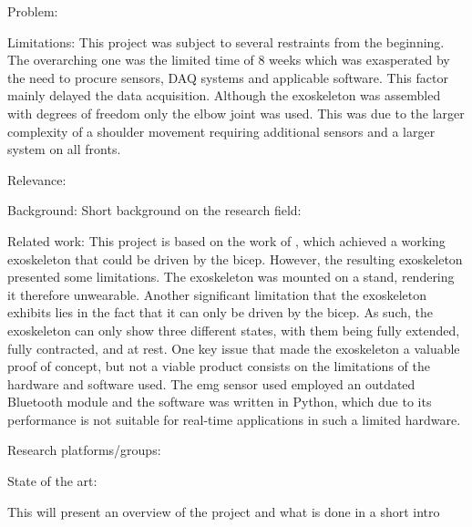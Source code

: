             Problem:
                

            Limitations:
                This project was subject to several restraints from the beginning. The overarching one was the limited time of 8 weeks which was
                exasperated by the need to procure sensors, DAQ systems and applicable software. This factor mainly delayed the data acquisition. 
                Although the exoskeleton was assembled with degrees of freedom only the elbow joint was used. This was due to the larger complexity 
                of a shoulder movement requiring additional sensors and a larger system on all fronts.
            
            Relevance: %


Background: 
    Short background on the research field:

    Related work: %
        This project is based on the work of \cite{AFES}, which achieved a working exoskeleton that could be driven by the bicep. However, the resulting 
        exoskeleton presented some limitations. The exoskeleton was mounted on a stand, rendering it therefore unwearable. Another significant limitation 
        that the exoskeleton exhibits lies in the fact that it can only be driven by the bicep. As such, the exoskeleton can only show three different states, 
        with them being fully extended, fully contracted, and at rest. One key issue that made the exoskeleton a valuable proof of concept, but not a viable 
        product consists on the limitations of the hardware and software used. The \acs{emg} sensor used employed an outdated Bluetooth module and the software was 
        written in Python, which due to its performance is not suitable for real-time applications in such a limited hardware.

    Research platforms/groups:

    State of the art:


    This will present an overview of the project and what is done in a short intro
